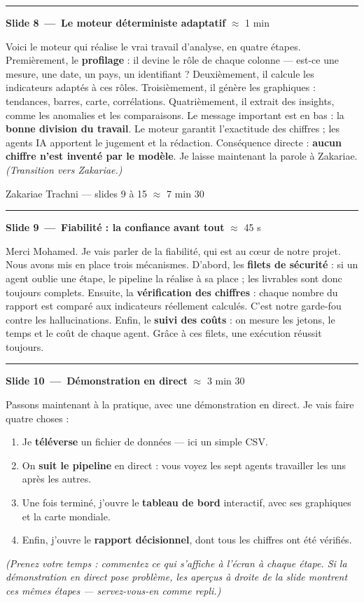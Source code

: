 \documentclass[11pt,a4paper]{article}
\newcommand{\presheader}[3]{%
  \bigskip\par\noindent
  \colorbox{accentdark}{%
    \parbox[c][0.98cm][c]{\dimexpr\linewidth-2\fboxsep\relax}{%
      \hspace{4pt}{\large\bfseries\color{white}#1}\quad
      {\color{accentsoft}\normalsize #2}\hfill
      {\color{accentsoft}\small #3}\hspace{4pt}}}%
  \par\medskip}
\newcommand{\slidecue}[3]{%
  \needspace{4\baselineskip}%
  \medskip\par\noindent
  {\color{accentdark}\rule[-3pt]{4pt}{17pt}}\hspace{8pt}%
  {\large\bfseries\color{ink}Slide #1\, — \,#2}%
  \hfill{\small\color{muted}#3}\par
  \nopagebreak\smallskip}
\newcommand{\cue}[1]{{\itshape\color{muted}#1}}
\begin{document}
\slidecue{8}{Le moteur déterministe adaptatif}{$\approx$ 1 min}
Voici le moteur qui réalise le vrai travail d'analyse, en quatre étapes.
Premièrement, le \textbf{profilage} : il devine le rôle de chaque colonne —
est-ce une mesure, une date, un pays, un identifiant ? Deuxièmement, il calcule
les indicateurs adaptés à ces rôles. Troisièmement, il génère les graphiques :
tendances, barres, carte, corrélations. Quatrièmement, il extrait des insights,
comme les anomalies et les comparaisons. Le message important est en bas : la
\textbf{bonne division du travail}. Le moteur garantit l'exactitude des
chiffres ; les agents IA apportent le jugement et la rédaction. Conséquence
directe : \textbf{aucun chiffre n'est inventé par le modèle}. Je laisse
maintenant la parole à Zakariae. \cue{(Transition vers Zakariae.)}

\presheader{Partie 2}{Zakariae Trachni — slides 9 à 15}{$\approx$ 7 min 30}

\slidecue{9}{Fiabilité : la confiance avant tout}{$\approx$ 45 s}
Merci Mohamed. Je vais parler de la fiabilité, qui est au c\oe ur de notre
projet. Nous avons mis en place trois mécanismes. D'abord, les \textbf{filets de
sécurité} : si un agent oublie une étape, le pipeline la réalise à sa place ;
les livrables sont donc toujours complets. Ensuite, la \textbf{vérification des
chiffres} : chaque nombre du rapport est comparé aux indicateurs réellement
calculés. C'est notre garde-fou contre les hallucinations. Enfin, le
\textbf{suivi des coûts} : on mesure les jetons, le temps et le coût de chaque
agent. Grâce à ces filets, une exécution réussit toujours.

\slidecue{10}{Démonstration en direct}{$\approx$ 3 min 30}
Passons maintenant à la pratique, avec une démonstration en direct. Je vais
faire quatre choses :
\begin{enumerate}[label=\textbf{\arabic*.}]
  \item Je \textbf{téléverse} un fichier de données — ici un simple CSV.
  \item On \textbf{suit le pipeline} en direct : vous voyez les sept agents
        travailler les uns après les autres.
  \item Une fois terminé, j'ouvre le \textbf{tableau de bord} interactif, avec
        ses graphiques et la carte mondiale.
  \item Enfin, j'ouvre le \textbf{rapport décisionnel}, dont tous les chiffres
        ont été vérifiés.
\end{enumerate}
\cue{(Prenez votre temps : commentez ce qui s'affiche à l'écran à chaque étape.
Si la démonstration en direct pose problème, les aperçus à droite de la slide
montrent ces mêmes étapes — servez-vous-en comme repli.)}
\end{document}
